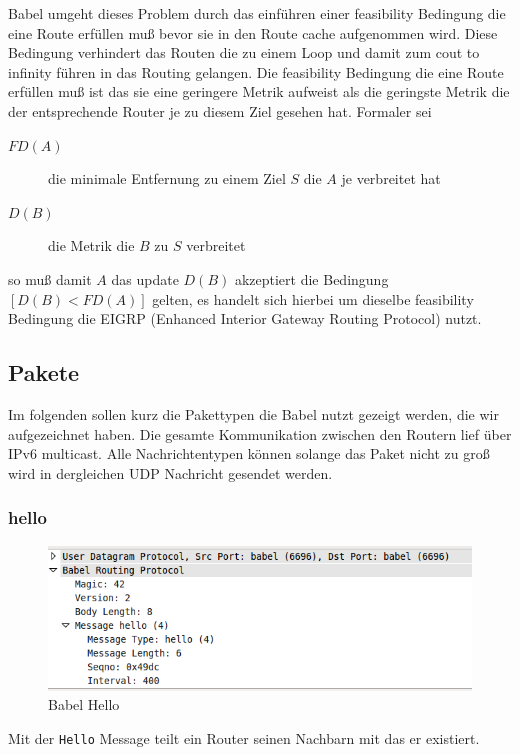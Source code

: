\documentclass[10pt]{scrartcl}
\begin{document}
	Babel umgeht dieses Problem durch das einführen einer feasibility Bedingung die eine Route erfüllen muß bevor sie  in den Route cache aufgenommen wird. Diese Bedingung verhindert das Routen die zu einem Loop und damit zum cout to infinity führen in das Routing gelangen.
	Die feasibility Bedingung die eine Route erfüllen muß ist das sie eine geringere Metrik aufweist als die geringste Metrik die der entsprechende Router je zu diesem Ziel gesehen hat. Formaler sei 
	\begin{description}
		\item[$FD(A)$] die minimale Entfernung zu einem Ziel $S$ die $A$ je verbreitet hat
		\item[$D(B)$] die Metrik die $B$ zu $S$ verbreitet
	\end{description} 
	so muß damit $A$ das update $D(B)$ akzeptiert die Bedingung $[D(B) < FD(A)]$ gelten, es handelt sich hierbei um dieselbe feasibility Bedingung die EIGRP (Enhanced Interior Gateway Routing Protocol) nutzt.
	
	\subsection{Pakete}
	Im folgenden sollen kurz die Pakettypen die Babel nutzt gezeigt werden, die wir aufgezeichnet haben. Die gesamte Kommunikation zwischen den Routern lief über IPv6 multicast. Alle Nachrichtentypen können solange das Paket nicht zu groß wird in dergleichen UDP Nachricht gesendet werden.
	
	\subsubsection{hello}
	\begin{figure}[H]
        \centering
                \includegraphics[scale=0.5]{img/babel_hello}
        \caption{Babel Hello}
        \label{img:testAufbau}
	\end{figure}	
	Mit der \verb!Hello! Message teilt ein Router seinen Nachbarn mit das er existiert.	
	
\end{document}
